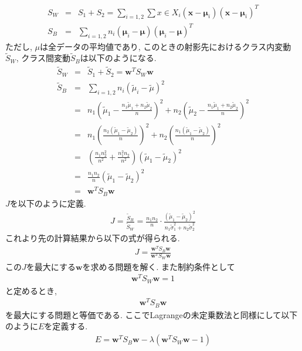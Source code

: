 \documentclass[dvipdfmx,a4j]{jsarticle}
\begin{document}
\begin{eqnarray*}
    S_{W}&=&S_{1}+S_{2}=\sum_{i=1,2}\sum{x\in X_{i}}(\bm{x}-\bm{\mu}_{i})(\bm{x}-\bm{\mu}_{i})^{T}\\
    S_{B}&=&\sum_{i=1,2}n_{i}(\bm{\mu}_{i}-\bm{\mu})(\bm{\mu}_{i}-\bm{\mu})^{T}
\end{eqnarray*}
ただし, $\mu$は全データの平均値であり, このときの射影先におけるクラス内変動$\tilde{S}_{W}$, クラス間変動$\tilde{S}_{B}$は以下のようになる.
\begin{eqnarray*}
    \tilde{S}_{W}&=&\tilde{S}_{1}+\tilde{S}_{2}=\bm{w}^{T}S_{W}\bm{w}\\
    \tilde{S}_{B}&=&\sum_{i=1,2}n_{i}(\tilde{\mu}_{i}-\tilde{\mu})^{2}\\
                 &=&n_{1}\left(\tilde{\mu}_{1}-\frac{n_{1}\tilde{\mu}_{1}+n_{2}\tilde{\mu}_{2}}{n}\right)^{2}+n_{2}\left(\tilde{\mu}_{2}-\frac{n_{1}\tilde{\mu}_{1}+n_{2}\tilde{\mu}_{2}}{n}\right)^{2}\\
                 &=&n_{1}\left(\frac{n_{2}(\tilde{\mu}_{1}-\tilde{\mu}_{2})}{n}\right)^{2}+n_{2}\left(\frac{n_{1}(\tilde{\mu}_{1}-\tilde{\mu}_{2})}{n}\right)^{2}\\
                 &=&\left(\frac{n_{1}n_{2}^{2}}{n^{2}}+\frac{n_{1}^{2}n_{2}}{n^{2}}\right)(\tilde{\mu}_{1}-\tilde{\mu}_{2})^{2}\\
                 &=&\frac{n_{1}n_{2}}{n}(\tilde{\mu}_{1}-\tilde{\mu}_{2})^{2}\\
                 &=&\bm{w}^{T}S_{B}\bm{w}
\end{eqnarray*}
$J$を以下のように定義.
\begin{align*}
    J=\frac{\tilde{S}_{B}}{\tilde{S}_{W}}=\frac{n_{1}n_{2}}{n}\cdot \frac{(\tilde{\mu}_{1}-\tilde{\mu}_{2})^{2}}{n_{1}\tilde{\sigma}_{1}^{2}+n_{2}\tilde{\sigma}_{2}^{2}} \tag{6.5}
\end{align*}
これより先の計算結果から以下の式が得られる.
\begin{eqnarray*}
    J=\frac{\bm{w}^{T}S_{B}\bm{w}}{\bm{w}^{T}S_{W}\bm{w}}
\end{eqnarray*}
この$J$を最大にする$\bm{w}$を求める問題を解く. また制約条件として
\begin{eqnarray*}
    \bm{w}^{T}S_{W}\bm{w}=1
\end{eqnarray*}
と定めるとき,
\begin{eqnarray*}
    \bm{w}^{T}S_{B}\bm{w}
\end{eqnarray*}
を最大にする問題と等価である.
ここでLagrangeの未定乗数法と同様にして以下のように$E$を定義する.
\begin{eqnarray*}
    E=\bm{w}^{T}S_{B}\bm{w}-\lambda(\bm{w}^{T}S_{W}\bm{w}-1)
\end{eqnarray*}
\end{document}
